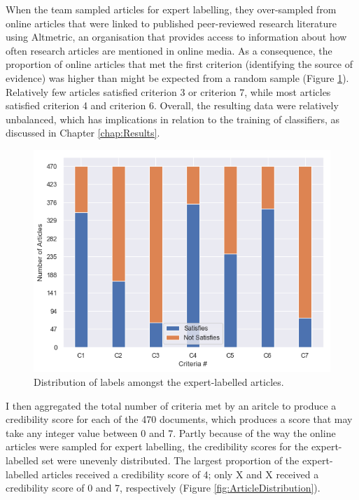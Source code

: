 \documentclass[a4paper,twoside,phd]{BYUPhys}
\begin{document}
When the team sampled articles for expert labelling, they over-sampled from online articles that were linked to published peer-reviewed research literature using Altmetric, an organisation that provides access to information about how often research articles are mentioned in online media. As a consequence, the proportion of online articles that met the first criterion (identifying the source of evidence) was higher than might be expected from a random sample (Figure \ref{fig:LabelDistribution}). Relatively few articles satisfied criterion 3 or criterion 7, while most articles satisfied criterion 4 and criterion 6. Overall, the resulting data were relatively unbalanced, which has implications in relation to the training of classifiers, as discussed in Chapter \ref{chap:Results}.


\begin{figure}[H]
	\centering
	\includegraphics[totalheight=6cm]{images/label-distribution.png}
	\caption{Distribution of labels amongst the expert-labelled articles.}
	\label{fig:LabelDistribution}
\end{figure}


I then aggregated the total number of criteria met by an aritcle to produce a credibility score for each of the 470 documents, which produces a score that may take any integer value between 0 and 7. Partly because of the way the online articles were sampled for expert labelling, the credibility scores for the expert-labelled set were unevenly distributed. The largest proportion of the expert-labelled articles received a credibility score of 4; only X and X received a credibility score of 0 and 7, respectively (Figure \ref{fig:ArticleDistribution}).
\end{document}
